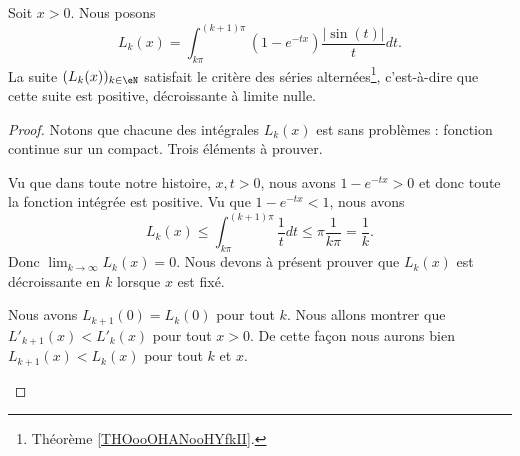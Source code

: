 \begin{lemma}     \label{LEMooZGODooLaBuHo}
	Soit \( x>0\). Nous posons
	\begin{equation}        \label{EQooJXWMooRbbCtt}
		L_k(x)=\int_{k\pi}^{(k+1)\pi}(1- e^{-tx})\frac{ | \sin(t) | }{ t }dt.
	\end{equation}
	La suite \( (L_k(x))_{k\in \eN}\) satisfait le critère des séries alternées\footnote{Théorème \ref{THOooOHANooHYfkII}.}, c'est-à-dire que cette suite est positive, décroissante à limite nulle.
\end{lemma}

\begin{proof}
	Notons que chacune des intégrales \( L_k(x)\) est sans problèmes : fonction continue sur un compact. Trois éléments à prouver.
	\begin{subproof}
		\spitem[Positive]
		Vu que dans toute notre histoire, \( x,t>0\), nous avons \( 1- e^{-tx}>0\) et donc toute la fonction intégrée est positive.
		Vu que \( 1- e^{-tx}<1\), nous avons
		\begin{equation}        \label{EQooCGAQooDSvbln}
			L_k(x)\leq \int_{k\pi}^{(k+1)\pi}\frac{1}{ t }dt\leq \pi\frac{1}{ k\pi }=\frac{1}{ k }.
		\end{equation}
		Donc \( \lim_{k\to \infty} L_k(x)=0\).
		\spitem[Décroissante]
		Nous devons à présent prouver que \( L_k(x)\) est décroissante en \( k\) lorsque \( x\) est fixé.

		Nous avons \( L_{k+1}(0)=L_k(0)\) pour tout \( k\). Nous allons montrer que \( L'_{k+1}(x)<L'_k(x)\) pour tout \( x>0\). De cette façon nous aurons bien \( L_{k+1}(x)<L_k(x)\) pour tout \( k\) et \( x\).


\end{subproof}
\end{proof}
